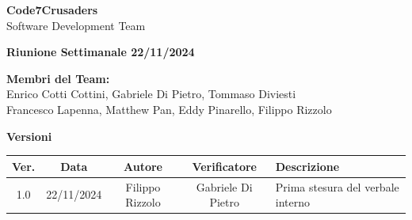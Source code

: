 \documentclass{article}
\begin{document}
\begin{titlepage}
    {\Huge \textbf{Code7Crusaders}}\\
    \vspace{0.5cm}
    {\Large Software Development Team}\\
    \vspace{2cm}
    
    {\large \textbf{Riunione Settimanale 22/11/2024}}\\ 
    \vspace{5cm}                           
    
    
    \textbf{Membri del Team:}\\
    Enrico Cotti Cottini, Gabriele Di Pietro, Tommaso Diviesti \\
    Francesco Lapenna, Matthew Pan, Eddy Pinarello, Filippo Rizzolo \\
    \vspace{0.5cm}
    
    \vspace{1cm}
\end{titlepage}



\newpage
\begin{table}[h!]
\centering
\textbf{Versioni} \\ %
\vspace{2mm} %
\begin{tabular}{|c|c|c|c|>{\raggedright\arraybackslash}p{}|}
    \hline
    \textbf{Ver.} & \textbf{Data} & \textbf{Autore} & \textbf{Verificatore} & \textbf{Descrizione} \\
    \hline
    1.0 & 22/11/2024 & Filippo Rizzolo & Gabriele Di Pietro & Prima stesura del verbale interno \\ 
    \hline                                  
\end{tabular}
\end{table}



\newpage
\tableofcontents



\newpage
\end{document}
